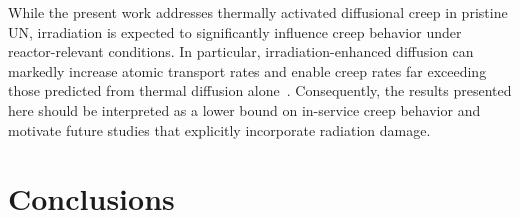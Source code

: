 \documentclass[preprint,12pt,sort&compress]{elsarticle} %
\newcommand{\?}{\stackrel{?}{=}}
\providecommand{\DIFaddtex}[1]{{\sf #1}} %
\providecommand{\DIFaddbegin}{\protect\color{blue}} %
\providecommand{\DIFaddend}{\protect\color{black}} %
\providecommand{\DIFadd}[1]{\texorpdfstring{\DIFaddtex{#1}}{#1}} %
\newcommand{\DIFaddincludegraphics}[2][]{{\color{blue}\fbox{\DIFOincludegraphics[#1]{#2}}}} %
\DeclareRobustCommand{\DIFaddbegin}{\DIFOaddbegin \let\includegraphics\DIFaddincludegraphics} %
\DeclareRobustCommand{\DIFaddend}{\DIFOaddend \let\includegraphics\DIFOincludegraphics} %
\begin{document}
\DIFaddbegin \DIFadd{While the present work addresses thermally activated diffusional creep in pristine UN, irradiation is expected to significantly influence creep behavior under reactor-relevant conditions. In particular, irradiation-enhanced diffusion can markedly increase atomic transport rates and enable creep rates far exceeding those predicted from thermal diffusion alone~\cite{Cooper2021}. Consequently, the results presented here should be interpreted as a lower bound on in-service creep behavior and motivate future studies that explicitly incorporate radiation damage.
}

\DIFaddend %

\FloatBarrier

\section{Conclusions}
\end{document}
